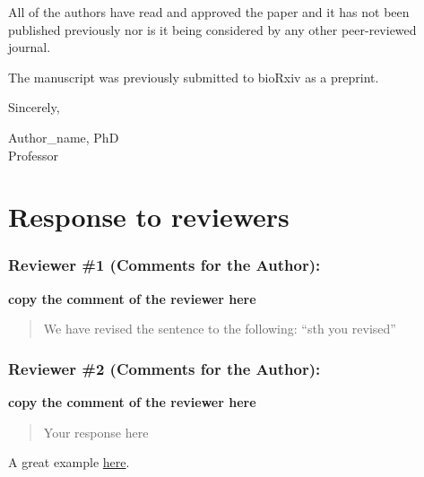 \documentclass[review]{elsarticle} %
\begin{document}
All of the authors have read and approved the paper and it has not been
published previously nor is it being considered by any other
peer-reviewed journal.

The manuscript was previously submitted to bioRxiv as a preprint.

Sincerely,

Author\_name, PhD\\
Professor

\section*{Response to reviewers}\label{response-to-reviewers}

\subsubsection*{Reviewer \#1 (Comments for the
Author):}\label{reviewer-1-comments-for-the-author}

\textbf{copy the comment of the reviewer here}

\begin{quote}
We have revised the sentence to the following: ``sth you revised''
\end{quote}

\subsubsection*{Reviewer \#2 (Comments for the
Author):}\label{reviewer-2-comments-for-the-author}

\textbf{copy the comment of the reviewer here}

\begin{quote}
Your response here
\end{quote}

A great example
\href{https://github.com/SchlossLab/Tomkovich_PEG3350_mSphere_2021/blob/master/submission/response_to_reviewers.md}{here}.
\end{document}
